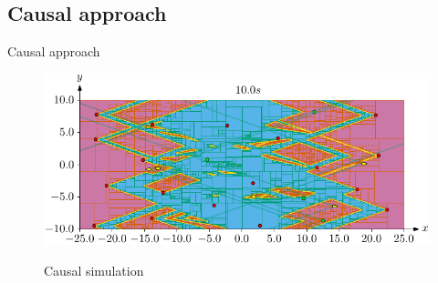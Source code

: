 \documentclass{beamer}
\begin{document}
        \subsection{Causal approach}

            \begin{frame}{Causal approach}
                \begin{figure}
                    \centering
                    \href{run:causal.mp4?autostart}{\includegraphics[width=\textwidth]{imgs/causal_cover}}
                    \caption{Causal simulation}
                \end{figure}
            \end{frame}
\end{document}
